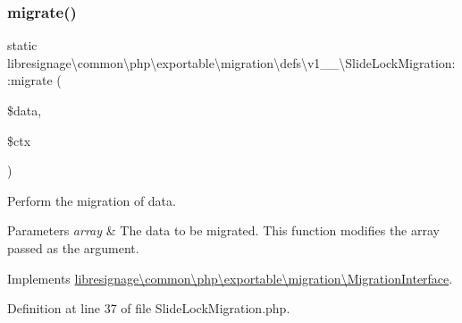 \subsubsection{\texorpdfstring{migrate()}{migrate()}}
{\footnotesize\ttfamily static libresignage\textbackslash{}common\textbackslash{}php\textbackslash{}exportable\textbackslash{}migration\textbackslash{}defs\textbackslash{}v1\+\_\+\_\textbackslash{}\+Slide\+Lock\+Migration\+::migrate (\begin{DoxyParamCaption}\item[{array \&}]{\$data,  }\item[{\hyperlink{classlibresignage_1_1common_1_1php_1_1exportable_1_1ExportableDataContext}{Exportable\+Data\+Context}}]{\$ctx }\end{DoxyParamCaption})\hspace{0.3cm}{\ttfamily [static]}}

Perform the migration of data.


\begin{DoxyParams}{Parameters}
{\em array} & The data to be migrated. This function modifies the array passed as the argument. \\
\hline
\end{DoxyParams}


Implements \hyperlink{interfacelibresignage_1_1common_1_1php_1_1exportable_1_1migration_1_1MigrationInterface_a8275bfe14f59f19bb3b33b239fd48c5d}{libresignage\textbackslash{}common\textbackslash{}php\textbackslash{}exportable\textbackslash{}migration\textbackslash{}\+Migration\+Interface}.



Definition at line 37 of file Slide\+Lock\+Migration.\+php.

\mbox{\label{classlibresignage_1_1common_1_1php_1_1exportable_1_1migration_1_1defs_1_1v1__0__0_1_1SlideLockMigration_a22f0d2e675217b42d859e96e93cf5632}} 
